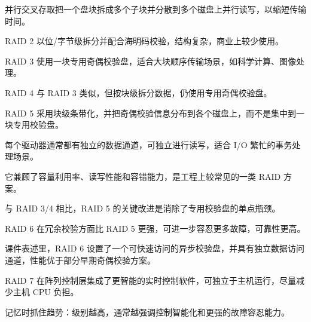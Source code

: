 \begin{points}
  \item 并行交叉存取把一个盘块拆成多个子块并分散到多个磁盘上并行读写，以缩短传输时间。
  \item RAID 2 以位/字节级拆分并配合海明码校验，结构复杂，商业上较少使用。
  \item RAID 3 使用一块专用奇偶校验盘，适合大块顺序传输场景，如科学计算、图像处理。
  \item RAID 4 与 RAID 3 类似，但按块级拆分数据，仍使用专用奇偶校验盘。
\end{points}


\begin{points}
  \item RAID 5 采用块级条带化，并把奇偶校验信息分布到各个磁盘上，而不是集中到一块专用校验盘。
  \item 每个驱动器通常都有独立的数据通道，可独立进行读写，适合 I/O 繁忙的事务处理场景。
  \item 它兼顾了容量利用率、读写性能和容错能力，是工程上较常见的一类 RAID 方案。
  \item 与 RAID 3/4 相比，RAID 5 的关键改进是消除了专用校验盘的单点瓶颈。
\end{points}


\begin{points}
  \item RAID 6 在冗余校验方面比 RAID 5 更强，可进一步容忍更多故障，可靠性更高。
  \item 课件表述里，RAID 6 设置了一个可快速访问的异步校验盘，并具有独立数据访问通道，性能优于部分早期奇偶校验方案。
  \item RAID 7 在阵列控制层集成了更智能的实时控制软件，可独立于主机运行，尽量减少主机 CPU 负担。
  \item 记忆时抓住趋势：级别越高，通常越强调控制智能化和更强的故障容忍能力。
\end{points}


